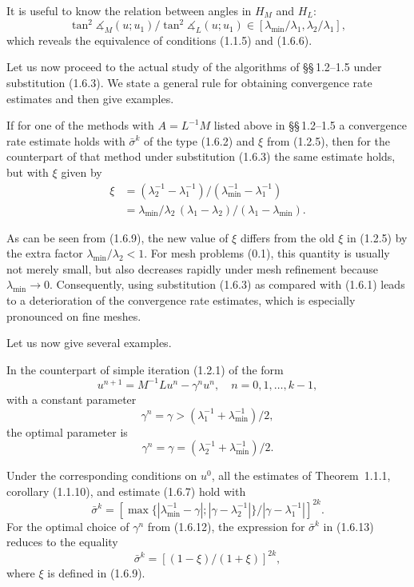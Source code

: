 \documentclass[11pt,oneside]{book}
\newcommand{\ang}{\measuredangle}
\begin{document}
It is useful to know the relation between angles in $H_M$ and $H_L$:
\[
\tan^2\ang_M(u; u_1) / \tan^2\ang_L(u; u_1) \in [\lambda_{\min}/\lambda_1, \lambda_2/\lambda_1], \tag{1.6.8}
\]
which reveals the equivalence of conditions (1.1.5) and (1.6.6).

Let us now proceed to the actual study of the algorithms of \S\S\,1.2--1.5 under substitution (1.6.3). We state a general rule for obtaining convergence rate estimates and then give examples.

If for one of the methods with $A = L^{-1}M$ listed above in \S\S\,1.2--1.5 a convergence rate estimate holds with $\bar{\sigma}^k$ of the type (1.6.2) and $\xi$ from (1.2.5), then for the counterpart of that method under substitution (1.6.3) the same estimate holds, but with $\xi$ given by
\[
\begin{aligned}
\xi &= (\lambda_2^{-1} - \lambda_1^{-1}) / (\lambda_{\min}^{-1} - \lambda_1^{-1}) \\
&= \lambda_{\min} / \lambda_2 \, (\lambda_1 - \lambda_2) / (\lambda_1 - \lambda_{\min}).
\end{aligned} \tag{1.6.9}
\]

As can be seen from (1.6.9), the new value of $\xi$ differs from the old $\xi$ in (1.2.5) by the extra factor $\lambda_{\min}/\lambda_2 < 1$. For mesh problems (0.1), this quantity is usually not merely small, but also decreases rapidly under mesh refinement because $\lambda_{\min} \to 0$. Consequently, using substitution (1.6.3) as compared with (1.6.1) leads to a deterioration of the convergence rate estimates, which is especially pronounced on fine meshes.

Let us now give several examples.

In the counterpart of simple iteration (1.2.1) of the form
\[
u^{n+1} = M^{-1}Lu^n - \gamma^n u^n, \quad n = 0, 1, \ldots, k - 1, \tag{1.6.10}
\]
with a constant parameter
\[
\gamma^n = \gamma > (\lambda_1^{-1} + \lambda_{\min}^{-1}) / 2, \tag{1.6.11}
\]
the optimal parameter is
\[
\gamma^n = \gamma = (\lambda_2^{-1} + \lambda_{\min}^{-1}) / 2. \tag{1.6.12}
\]

Under the corresponding conditions on $u^0$, all the estimates of Theorem~1.1.1, corollary (1.1.10), and estimate (1.6.7) hold with
\[
\bar{\sigma}^k = [\max\{|\lambda_{\min}^{-1} - \gamma|; |\gamma - \lambda_2^{-1}|\} / |\gamma - \lambda_1^{-1}|]^{2k}. \tag{1.6.13}
\]
For the optimal choice of $\gamma^n$ from (1.6.12), the expression for $\bar{\sigma}^k$ in (1.6.13) reduces to the equality
\[
\bar{\sigma}^k = [(1 - \xi) / (1 + \xi)]^{2k}, \tag{1.6.14}
\]
where $\xi$ is defined in (1.6.9).
\end{document}
